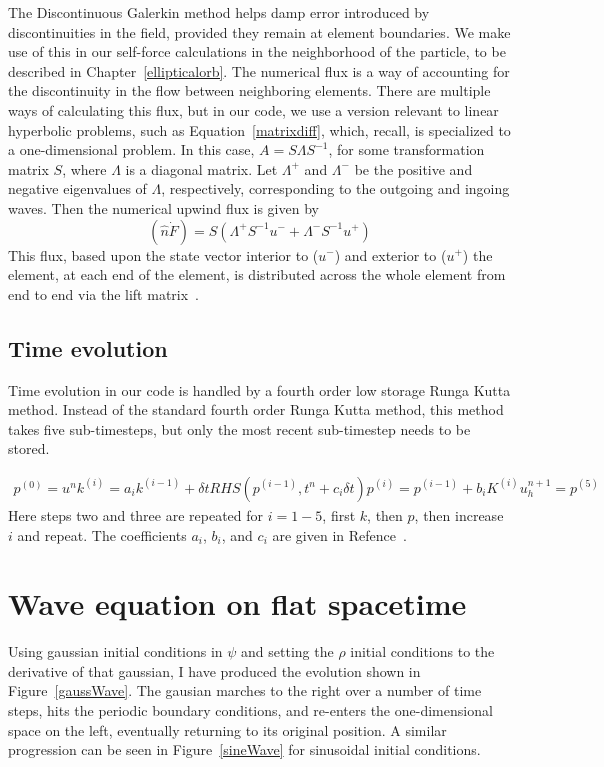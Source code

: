 The Discontinuous Galerkin method helps damp error introduced by discontinuities in the field, provided they remain at element boundaries. We make use of this in our self-force calculations in the neighborhood of the particle, to be described in Chapter~\ref{ellipticalorb}. The numerical flux is a way of accounting for the discontinuity in the flow between neighboring elements. There are multiple ways of calculating this flux, but in our code, we use a version relevant to linear hyperbolic problems, such as Equation~\ref{matrixdiff}, which, recall, is specialized to a one-dimensional problem. In this case, $A=S\Lambda S^{-1}$, for some transformation matrix $S$, where $\Lambda$ is a diagonal matrix. Let $\Lambda^+$ and $\Lambda^-$ be the positive and negative eigenvalues of $\Lambda$, respectively, corresponding to the outgoing and ingoing waves. Then the numerical upwind flux is given by
\begin{equation}
  (\hat{n}\dot F)=S(\Lambda^+ S^{-1} u^- + \Lambda^- S^{-1} u^+)
\end{equation}
This flux, based upon the state vector interior to ($u^-$) and exterior to ($u^+$) the element, at each end of the element, is distributed across the whole element from end to end via the lift matrix~\cite{dghesthaven}.


\subsection{Time evolution}

Time evolution in our code is handled by a fourth order low storage Runga Kutta method. Instead of the standard fourth order Runga Kutta method, this method takes five sub-timesteps, but only the most recent sub-timestep needs to be stored.

\begin{eqnarray}
  p^{(0)}=u^n
  k^{(i)}=a_ik^{(i-1)}+\delta t RHS(p^{(i-1)},t^n+c_i\delta t)
  p^{(i)}=p^{(i-1)}+b_iK^{(i)}
  u_h^{n+1}=p^{(5)}
\end{eqnarray}
Here steps two and three are repeated for $i=1-5$, first $k$, then $p$, then increase $i$ and repeat. The coefficients $a_i$, $b_i$, and $c_i$ are given in Refence~\cite{dghesthaven}.

\section{Wave equation on flat spacetime}

Using gaussian initial conditions in $\psi$ and setting the $\rho$ initial conditions to the derivative of that gaussian, I have produced the evolution shown in Figure~\ref{gaussWave}. The gausian marches to the right over a number of time steps, hits the periodic boundary conditions, and re-enters the one-dimensional space on the left, eventually returning to its original position. A similar progression can be seen in Figure~\ref{sineWave} for sinusoidal initial conditions.

